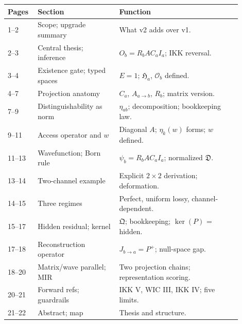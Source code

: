\documentclass[11pt,a4paper,oneside]{article}
\newcommand{\Ha}{\mathfrak{H}_a}
\newcommand{\Osp}{\mathcal{O}_b}
\begin{document}
\begin{longtable}{p{0.10\linewidth}p{0.32\linewidth}p{0.48\linewidth}}
\toprule
Pages & Section & Function \\
\midrule
1--2   & Scope; upgrade summary       & What v2 adds over v1. \\
2--3   & Central thesis; inference     & $O_b = R_b A C_a I_a$; IKK reversal. \\
3--4   & Existence gate; typed spaces  & $E=1$; $\Ha$, $\Osp$ defined. \\
4--7   & Projection anatomy            & $C_a$, $A_{a\to b}$, $R_b$; matrix version. \\
7--9   & Distinguishability as norm    & $\eta_{ab}$; decomposition; bookkeeping law. \\
9--11  & Access operator and $w$       & Diagonal $A$; $\eta_k(w)$ forms; $w$ defined. \\
11--13 & Wavefunction; Born rule       & $\psi_b = R_b A C_a I_a$; normalized $\mathfrak{D}$. \\
13--14 & Two-channel example           & Explicit $2\times 2$ derivation; deformation. \\
14--15 & Three regimes                 & Perfect, uniform lossy, channel-dependent. \\
15--17 & Hidden residual; kernel       & $\mathfrak{Q}$; bookkeeping; $\ker(P)$ = hidden. \\
17--18 & Reconstruction operator       & $J_{b\to a} = P^+$; null-space gap. \\
18--20 & Matrix/wave parallel; MIR    & Two projection chains; representation scoring. \\
20--21 & Forward refs; guardrails      & IKK V, WIC III, IKK IV; five limits. \\
21--22 & Abstract; map                 & Thesis and structure. \\
\bottomrule
\end{longtable}
\end{document}
